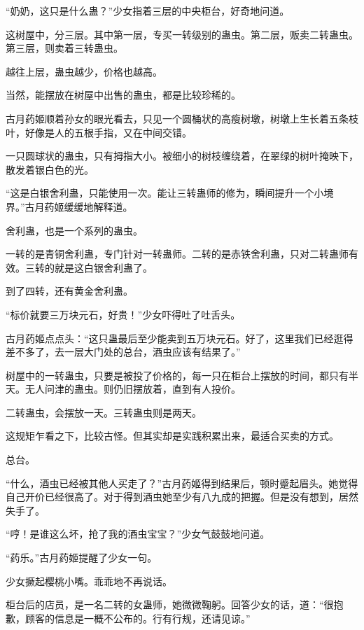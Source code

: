
\begin{this_body}



“奶奶，这只是什么蛊？”少女指着三层的中央柜台，好奇地问道。

这树屋中，分三层。其中第一层，专买一转级别的蛊虫。第二层，贩卖二转蛊虫。第三层，则卖着三转蛊虫。

越往上层，蛊虫越少，价格也越高。

当然，能摆放在树屋中出售的蛊虫，都是比较珍稀的。

古月药姬顺着孙女的眼光看去，只见一个圆桶状的高瘦树墩，树墩上生长着五条枝叶，好像是人的五根手指，又在中间交错。

一只圆球状的蛊虫，只有拇指大小。被细小的树枝缠绕着，在翠绿的树叶掩映下，散发着银白色的光。

“这是白银舍利蛊，只能使用一次。能让三转蛊师的修为，瞬间提升一个小境界。”古月药姬缓缓地解释道。

舍利蛊，也是一个系列的蛊虫。

一转的是青铜舍利蛊，专门针对一转蛊师。二转的是赤铁舍利蛊，只对二转蛊师有效。三转的就是这白银舍利蛊了。

到了四转，还有黄金舍利蛊。

“标价就要三万块元石，好贵！”少女吓得吐了吐舌头。

古月药姬点点头：“这只蛊最后至少能卖到五万块元石。好了，这里我们已经逛得差不多了，去一层大门处的总台，酒虫应该有结果了。”

树屋中的一转蛊虫，只要是被投了价格的，每一只在柜台上摆放的时间，都只有半天。无人问津的蛊虫。则仍旧摆放着，直到有人投价。

二转蛊虫，会摆放一天。三转蛊虫则是两天。

这规矩乍看之下，比较古怪。但其实却是实践积累出来，最适合买卖的方式。

总台。

“什么，酒虫已经被其他人买走了？”古月药姬得到结果后，顿时蹙起眉头。她觉得自己开价已经很高了。对于得到酒虫她至少有八九成的把握。但是没有想到，居然失手了。

“哼！是谁这么坏，抢了我的酒虫宝宝？”少女气鼓鼓地问道。

“药乐。”古月药姬提醒了少女一句。

少女撅起樱桃小嘴。乖乖地不再说话。

柜台后的店员，是一名二转的女蛊师，她微微鞠躬。回答少女的话，道：“很抱歉，顾客的信息是一概不公布的。行有行规，还请见谅。”


\end{this_body}
